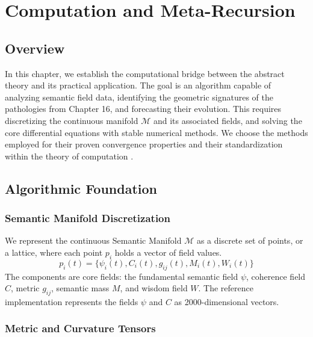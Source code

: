 \chapter{Computation and Meta-Recursion}

\section{Overview}

In this chapter, we establish the computational bridge between the abstract theory and its practical application. The goal is an algorithm capable of analyzing semantic field data, identifying the geometric signatures of the pathologies from Chapter 16, and forecasting their evolution. This requires discretizing the continuous manifold \(\mathcal{M}\) and its associated fields, and solving the core differential equations with stable numerical methods. We choose the methods employed for their proven convergence properties and their standardization within the theory of computation \autocite{Sipser2012}.

\section{Algorithmic Foundation}

\subsection{Semantic Manifold Discretization}

We represent the continuous Semantic Manifold \(\mathcal{M}\) as a discrete set of points, or a lattice, where each point \(p_i\) holds a vector of field values.
\begin{equation}
p_i(t) = \{\psi_i(t), C_i(t), g_{ij}(t), M_i(t), W_i(t)\}
\end{equation}
The components are core fields: the fundamental semantic field \(\psi\), coherence field \(C\), metric \(g_{ij}\), semantic mass \(M\), and wisdom field \(W\). The reference implementation represents the fields \(\psi\) and \(C\) as 2000-dimensional vectors.

\subsection{Metric and Curvature Tensors}

